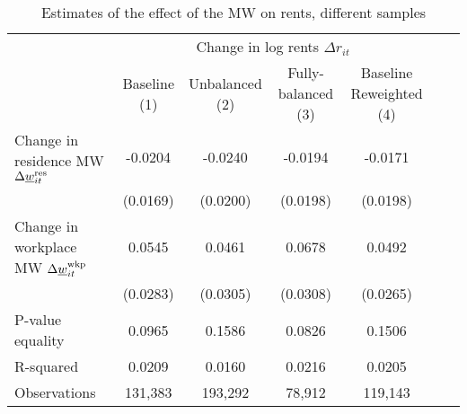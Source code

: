 \begin{table}[hbt!]
    \caption{Estimates of the effect of the MW on rents, different samples}
    \label{tab:static_sample}

    \begin{tabular}{@{}lcccccc@{}}
        \toprule
                                             & \multicolumn{4}{c}{Change in log rents $\Delta r_{it}$}                   \\ \cmidrule(l){2-5} 
                                             & \shortstack{Baseline\\(1)}       & \shortstack{Unbalanced\\(2)}     
                                             & \shortstack{Fully-balanced\\(3)} & \shortstack{Baseline\\Reweighted (4)}  \\ \midrule
        Change in residence MW 
                  $\Delta\underline{w}_{it}^{\text{res}}$    & -0.0204      & -0.0240        & -0.0194       & -0.0171               \\
                                             & (0.0169)    & (0.0200)      & (0.0198)     & (0.0198)              \\
        Change in workplace MW 
                   $\Delta\underline{w}_{it}^{\text{wkp}}$   & 0.0545      & 0.0461        & 0.0678       & 0.0492               \\
                                             & (0.0283)    & (0.0305)      & (0.0308)     & (0.0265)              \\ \midrule
        P-value equality                     & 0.0965      & 0.1586        & 0.0826       & 0.1506               \\
        R-squared                            & 0.0209      & 0.0160        & 0.0216       & 0.0205               \\
        Observations                         & 131,383     & 193,292       & 78,912      & 119,143             \\ \bottomrule
    \end{tabular}


\end{table}
